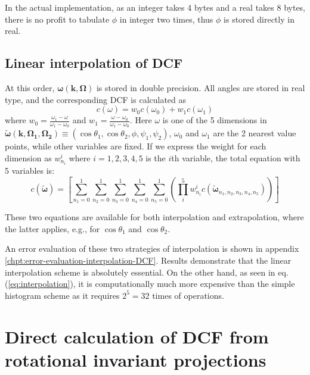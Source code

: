 In the actual implementation, as an integer takes 4 bytes and a real
takes 8 bytes, there is no profit to tabulate $\phi$ in integer two
times, thus $\phi$ is stored directly in real.

\subsection{Linear interpolation of DCF\label{subsec:Linear-interpolation-of}}

At this order, $\boldsymbol{\omega}(\mathbf{k},\mathbf{\Omega})$
is stored in double precision. All angles are stored in real type,
and the corresponding DCF is calculated as
\begin{equation}
c(\omega)=w_{0}c(\omega_{0})+w_{1}c(\omega_{1})
\end{equation}
where $w_{0}=\frac{\omega_{1}-\omega}{\omega_{1}-\omega_{0}}$ and
$w_{1}=\frac{\omega-\omega_{0}}{\omega_{1}-\omega_{0}}$. Here $\omega$
is one of the 5 dimensions in $\tilde{\boldsymbol{\omega}}(\mathbf{k},\mathbf{\Omega_{1}},\mathbf{\Omega_{2}})\equiv(\cos\theta_{1},\cos\theta_{2},\phi,\psi_{1},\psi_{2})$,
$\omega_{0}$ and $\omega_{1}$ are the 2 nearest value points, while
other variables are fixed. If we express the weight for each dimension
as $w_{n_{i}}^{i}$ where $i=1,2,3,4,5$ is the $i$th variable, the
total equation with 5 variables is:
\begin{equation}
c(\tilde{\boldsymbol{\omega}})=\left[\sum_{n_{1}=0}^{1}\sum_{n_{2}=0}^{1}\sum_{n_{3}=0}^{1}\sum_{n_{4}=0}^{1}\sum_{n_{5}=0}^{1}\left(\prod_{i}^{5}w_{n_{i}}^{i}c(\tilde{\boldsymbol{\omega}}_{n_{1},n_{2},n_{3},n_{4},n_{5}})\right)\right]\label{eq:interpolation}
\end{equation}

These two equations are available for both interpolation and extrapolation,
where the latter applies, e.g., for $\cos\theta_{1}$ and $\cos\theta_{2}$. 

An error evaluation of these two strategies of interpolation is shown
in appendix \ref{chpt:error-evaluation-interpolation-DCF}. Results
demonstrate that the linear interpolation scheme is absolutely essential.
On the other hand, as seen in eq. (\ref{eq:interpolation}), it is
computationally much more expensive than the simple histogram scheme
as it requires $2^{5}=32$ times of operations.

\section{Direct calculation of DCF from rotational invariant projections}

